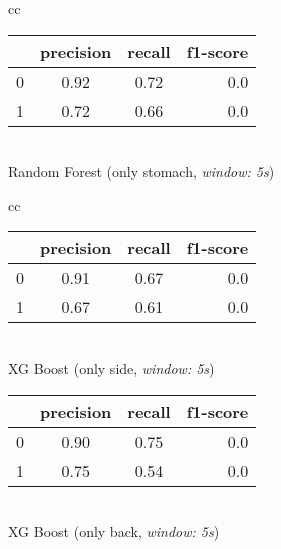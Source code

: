 \begin{table}
\begin{tabular}{cc}
    \begin{minipage}{0.33\textwidth}
        \begin{center}
            \begin{tabular}{ | l | c | c | r | }
              \hline
               & precision & recall & f1-score \\ \hline
              0 & 0.92 & 0.72 & 0.0 \\ \hline
              1 & 0.72 & 0.66 & 0.0 \\
              \hline
            \end{tabular}
            \smallskip
            \\ Random Forest (only stomach, \textit{window: 5s})
        \end{center}
    \end{minipage}
\end{tabular}
\newline
\vspace*{5mm}
\newline
\begin{tabular}{cc}
    \begin{minipage}{0.33\textwidth}
        \begin{center}
            \begin{tabular}{ | l | c | c | r | }
              \hline
               & precision & recall & f1-score \\ \hline
              0 & 0.91 & 0.67 & 0.0 \\ \hline
              1 & 0.67 & 0.61 & 0.0 \\
              \hline
            \end{tabular}
            \smallskip
            \\ XG Boost (only side, \textit{window: 5s})
        \end{center}
    \end{minipage}

    \begin{minipage}{0.33\textwidth}
        \begin{center}
            \begin{tabular}{ | l | c | c | r | }
              \hline
               & precision & recall & f1-score \\ \hline
              0 & 0.90 & 0.75 & 0.0 \\ \hline
              1 & 0.75 & 0.54 & 0.0 \\
              \hline
            \end{tabular}
            \smallskip
            \\ XG Boost (only back, \textit{window: 5s})
        \end{center}
    \end{minipage}


\end{tabular}
\end{table}
